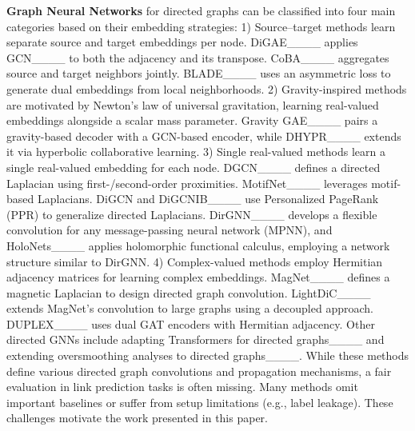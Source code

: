 \textbf{Graph Neural Networks} for directed graphs can be classified into four main categories based on their embedding strategies: 1) Source–target methods learn separate source and target embeddings per node. DiGAE____ applies GCN____ to both the adjacency and its transpose. CoBA____ aggregates source and target neighbors jointly. BLADE____ uses an asymmetric loss to generate dual embeddings from local neighborhoods. 2) Gravity-inspired methods are motivated by Newton’s law of universal gravitation, learning real-valued embeddings alongside a scalar mass parameter. Gravity GAE____ pairs a gravity-based decoder with a GCN-based encoder, while DHYPR____ extends it via hyperbolic collaborative learning. 3) Single real-valued methods learn a single real-valued embedding for each node. DGCN____ defines a directed Laplacian using first-/second-order proximities. MotifNet____ leverages motif-based Laplacians. DiGCN and DiGCNIB____ use Personalized PageRank (PPR) to generalize directed Laplacians. DirGNN____ develops a flexible convolution for any message-passing neural network (MPNN), and HoloNets____ applies holomorphic functional calculus, employing a network structure similar to DirGNN. 4) Complex-valued methods employ Hermitian adjacency matrices for learning complex embeddings. MagNet____ defines a magnetic Laplacian to design directed graph convolution. LightDiC____ extends MagNet’s convolution to large graphs using a decoupled approach. DUPLEX____ uses dual GAT encoders with Hermitian adjacency. Other directed GNNs include adapting Transformers for directed graphs____ and extending oversmoothing analyses to directed graphs____.
While these methods define various directed graph convolutions and propagation mechanisms, a fair evaluation in link prediction tasks is often missing. Many methods omit important baselines or suffer from setup limitations (e.g., label leakage). These challenges motivate the work presented in this paper.




